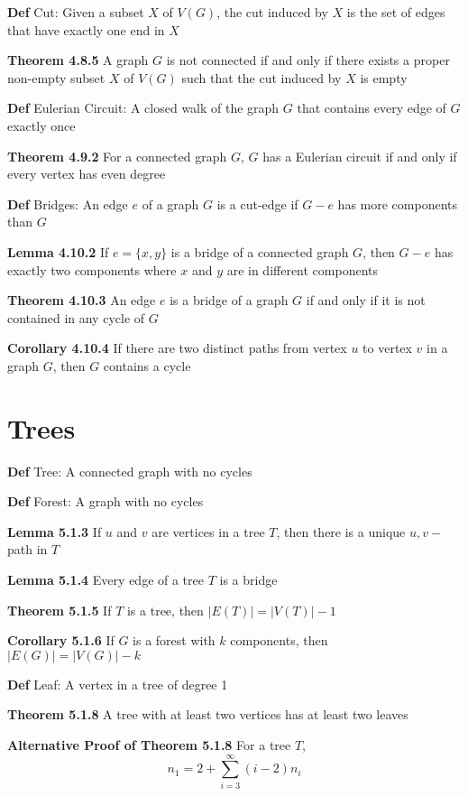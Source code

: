 \documentclass[11pt,notitlepage]{report}
\newcommand{\tbf}[1]{\textbf{#1}}
\begin{document}
\tbf{Def} Cut: Given a subset $X$ of $V(G)$, the cut induced by $X$ is the set of edges that have exactly one end in $X$

\tbf{Theorem 4.8.5} A graph $G$ is not connected if and only if there exists a proper non-empty subset $X$ of $V(G)$ such that the cut induced by $X$ is empty

\tbf{Def} Eulerian Circuit: A closed walk of the graph $G$ that contains every edge of $G$ exactly once

\tbf{Theorem 4.9.2} For a connected graph $G$, $G$ has a Eulerian circuit if and only if every vertex has even degree

\tbf{Def} Bridges: An edge $e$ of a graph $G$ is a cut-edge if $G-e$ has more components than $G$

\tbf{Lemma 4.10.2} If $e = \{x, y\}$ is a bridge of a connected graph $G$, then $G-e$ has exactly two components where $x$ and $y$ are in different components

\tbf{Theorem 4.10.3} An edge $e$ is a bridge of a graph $G$ if and only if it is not contained in any cycle of $G$

\tbf{Corollary 4.10.4} If there are two distinct paths from vertex $u$ to vertex $v$ in a graph $G$, then $G$ contains a cycle

\newpage
\section{Trees}
\vspace{-3mm}
\tbf{Def} Tree: A connected graph with no cycles

\tbf{Def} Forest: A graph with no cycles

\tbf{Lemma 5.1.3} If $u$ and $v$ are vertices in a tree $T$, then there is a unique $u,v-$path in $T$

\tbf{Lemma 5.1.4} Every edge of a tree $T$ is a bridge

\tbf{Theorem 5.1.5} If $T$ is a tree, then $|E(T)| = |V(T)| - 1$

\tbf{Corollary 5.1.6} If $G$ is a forest with $k$ components, then $|E(G)| = |V(G)| - k$

\tbf{Def} Leaf: A vertex in a tree of degree 1

\tbf{Theorem 5.1.8} A tree with at least two vertices has at least two leaves

\tbf{Alternative Proof of Theorem 5.1.8} For a tree $T$, 
\vspace{-3mm}
$$n_1 = 2 + \sum_{i=3}^{\infty}(i-2)n_i$$
\vspace{-8mm}
\end{document}
